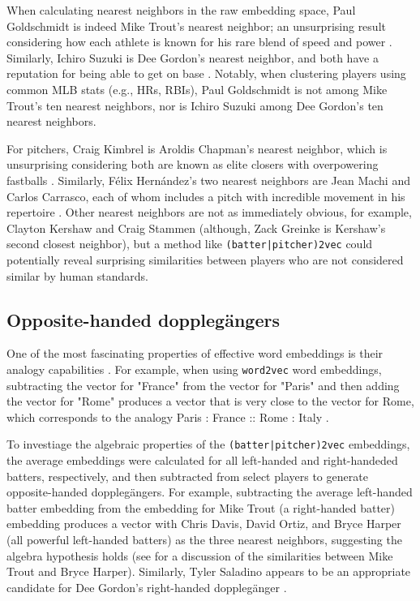 \documentclass{article}
\begin{document}
When calculating nearest neighbors in the raw embedding space, Paul Goldschmidt is indeed Mike Trout's nearest neighbor; an unsurprising result considering how each athlete is known for his rare blend of speed and power \parencite{Kory2015}. Similarly, Ichiro Suzuki is Dee Gordon's nearest neighbor, and both have a reputation for being able to get on base \parencite{Sullivan2015}. Notably, when clustering players using common MLB stats (e.g., HRs, RBIs), Paul Goldschmidt is not among Mike Trout's ten nearest neighbors, nor is Ichiro Suzuki among Dee Gordon's ten nearest neighbors.

For pitchers, Craig Kimbrel is Aroldis Chapman's nearest neighbor, which is unsurprising considering both are known as elite closers with overpowering fastballs \parencite{Mirsky2016}. Similarly, Félix Hernández's two nearest neighbors are Jean Machi and Carlos Carrasco, each of whom includes a pitch with incredible movement in his repertoire \parencite{Buchanan2015, Romano2015, Berg2016}. Other nearest neighbors are not as immediately obvious, for example, Clayton Kershaw and Craig Stammen (although, Zack Greinke is Kershaw's second closest neighbor), but a method like \texttt{(batter|pitcher)2vec} could potentially reveal surprising similarities between players who are not considered similar by human standards.

\subsection{Opposite-handed dopplegängers}

One of the most fascinating properties of effective word embeddings is their analogy capabilities \parencite{Mikolov2013a}. For example, when using \texttt{word2vec} word embeddings, subtracting the vector for "France" from the vector for "Paris" and then adding the vector for "Rome" produces a vector that is very close to the vector for Rome, which corresponds to the analogy Paris : France :: Rome : Italy \parencite{Mikolov2013a}.

To investiage the algebraic properties of the \texttt{(batter|pitcher)2vec} embeddings, the average embeddings were calculated for all left-handed and right-handeded batters, respectively, and then subtracted from select players to generate opposite-handed dopplegängers. For example, subtracting the average left-handed batter embedding from the embedding for Mike Trout (a right-handed batter) embedding produces a vector with Chris Davis, David Ortiz, and Bryce Harper (all powerful left-handed batters) as the three nearest neighbors, suggesting the algebra hypothesis holds (see \parencite{Spector2016} for a discussion of the similarities between Mike Trout and Bryce Harper). Similarly, Tyler Saladino appears to be an appropriate candidate for Dee Gordon's right-handed dopplegänger \parencite{Chamberlain2017}.
\end{document}
